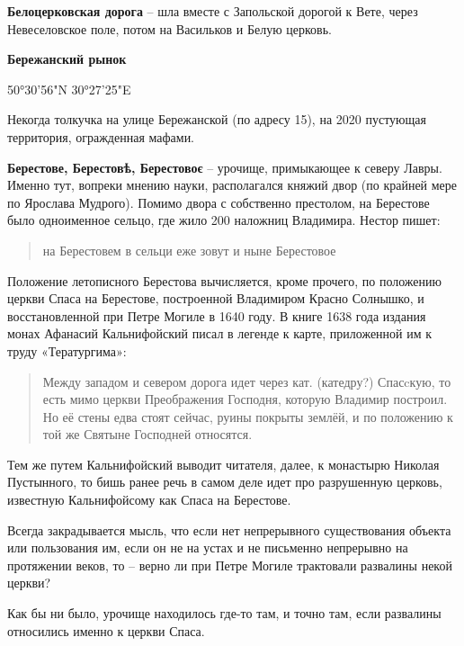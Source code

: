 \medskip


\textbf{Белоцерковская дорога} – шла вместе с Запольской дорогой к Вете, через Невеселовское поле, потом на Васильков и Белую церковь.\\

\medskip

\textbf{Бережанский рынок}

50°30'56"N 30°27'25"E

Некогда толкучка на улице Бережанской (по адресу 15), на 2020 пустующая территория, огражденная мафами.\\

\medskip


\textbf{Берестове, Берестовѣ, Берестовоє} – урочище, примыкающее к северу Лавры. Именно тут, вопреки мнению науки, располагался княжий двор (по крайней мере по Ярослава Мудрого). Помимо двора с собственно престолом, на Берестове было одноименное сельцо, где жило 200 наложниц Владимира. Нестор пишет:

\begin{quotation}
\noindent на Берестовем в сельци еже зовут и ныне Берестовое
\end{quotation}

Положение летописного Берестова вычисляется, кроме прочего, по положению церкви Спаса на Берестове, построенной Владимиром Красно Солнышко, и восстановленной при Петре Могиле в 1640 году. В книге 1638 года издания монах Афанасий Кальнифойский писал в легенде к карте, приложенной им к труду «Тератургима»:

\begin{quotation}
Между западом и севером дорога идет через кат. (катедру?) Спасcкую, то есть мимо церкви Преображения Господня, которую Владимир построил. Но её стены едва стоят сейчас, руины покрыты землёй, и по положению к той же Святыне Господней относятся.
\end{quotation}

Тем же путем Кальнифойский выводит читателя, далее, к монастырю Николая Пустынного, то бишь ранее речь в самом деле идет про разрушенную церковь, известную Кальнифойсому как Спаса на Берестове.

Всегда закрадывается мысль, что если нет непрерывного существования объекта или пользования им, если он не на устах и не письменно непрерывно на протяжении веков, то – верно ли при Петре Могиле трактовали развалины некой церкви?

Как бы ни было, урочище находилось где-то там, и точно там, если развалины относились именно к церкви Спаса.


